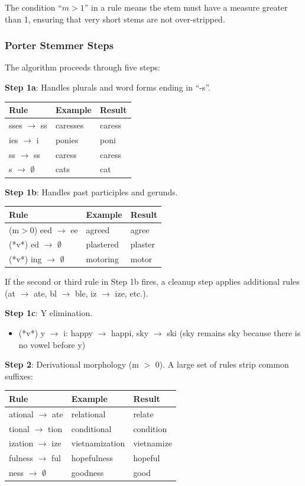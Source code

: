 \documentclass[11pt,a4paper]{article}
\begin{document}
The condition ``$m > 1$'' in a rule means the stem must have a measure greater than 1, ensuring that very short stems are not over-stripped.

\subsubsection{Porter Stemmer Steps}

The algorithm proceeds through five steps:

\textbf{Step 1a}: Handles plurals and word forms ending in ``-s''.
\begin{center}
\begin{tabular}{|l|l|l|}
\hline
\textbf{Rule} & \textbf{Example} & \textbf{Result} \\ \hline
sses $\to$ ss & caresses & caress \\ \hline
ies $\to$ i & ponies & poni \\ \hline
ss $\to$ ss & caress & caress \\ \hline
s $\to$ $\emptyset$ & cats & cat \\ \hline
\end{tabular}
\end{center}

\textbf{Step 1b}: Handles past participles and gerunds.
\begin{center}
\begin{tabular}{|l|l|l|}
\hline
\textbf{Rule} & \textbf{Example} & \textbf{Result} \\ \hline
(m$>$0) eed $\to$ ee & agreed & agree \\ \hline
(*v*) ed $\to$ $\emptyset$ & plastered & plaster \\ \hline
(*v*) ing $\to$ $\emptyset$ & motoring & motor \\ \hline
\end{tabular}
\end{center}
If the second or third rule in Step 1b fires, a cleanup step applies additional rules (at $\to$ ate, bl $\to$ ble, iz $\to$ ize, etc.).

\textbf{Step 1c}: Y elimination.
\begin{itemize}
    \item (*v*) y $\to$ i: happy $\to$ happi, sky $\to$ ski (sky remains sky because there is no vowel before y)
\end{itemize}

\textbf{Step 2}: Derivational morphology (m $>$ 0). A large set of rules strip common suffixes:
\begin{center}
\begin{tabular}{|l|l|l|}
\hline
\textbf{Rule} & \textbf{Example} & \textbf{Result} \\ \hline
ational $\to$ ate & relational & relate \\ \hline
tional $\to$ tion & conditional & condition \\ \hline
ization $\to$ ize & vietnamization & vietnamize \\ \hline
fulness $\to$ ful & hopefulness & hopeful \\ \hline
ness $\to$ $\emptyset$ & goodness & good \\ \hline
\end{tabular}
\end{center}
\end{document}
